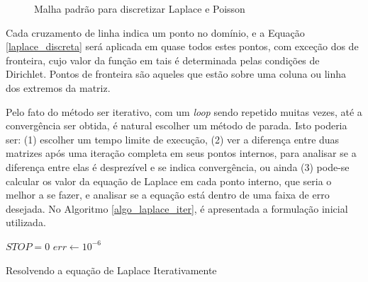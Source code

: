 \documentclass[journal]{IEEEtran}
\begin{document}
\begin{figure}[!ht]
\centering
{}
\caption{Malha padrão para discretizar Laplace e Poisson\label{malha_poisson}}
\end{figure}
Cada cruzamento de linha indica um ponto no domínio, e a Equação \ref{laplace_discreta} será aplicada em quase todos estes pontos, com exceção dos de fronteira, cujo valor da função em tais é determinada pelas condições de Dirichlet. Pontos de fronteira são aqueles que estão sobre uma coluna ou linha dos extremos da matriz.

Pelo fato do método ser iterativo, com um \textit{loop} sendo repetido muitas vezes, até a convergência ser obtida, é natural escolher um método de parada. Isto poderia ser: (1) escolher um tempo limite de execução, (2) ver a diferença entre duas matrizes após uma iteração completa em seus pontos internos, para analisar se a diferença entre elas é desprezível e se indica convergência, ou ainda (3) pode-se calcular os valor da equação de Laplace em cada ponto interno, que seria o melhor a se fazer, e analisar se a equação está dentro de uma faixa de erro desejada. No Algoritmo \ref{algo_laplace_iter}, é apresentada a formulação inicial utilizada.

\begin{algorithm}
\BlankLine
$STOP=0$\;
$err \leftarrow 10^{-6}$\;

\caption{Resolvendo a equação de Laplace Iterativamente}\label{algo_laplace_iter}
\end{algorithm}
\end{document}
